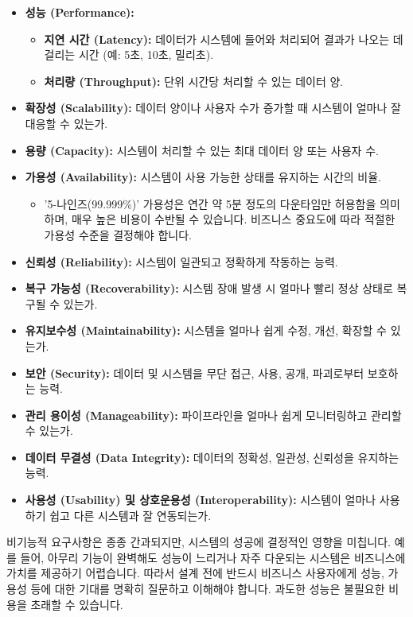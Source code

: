 \documentclass[11pt,a4paper]{article}
\theoremstyle{definition}
\begin{document}
\begin{itemize}
    \item \textbf{성능 (Performance):}
    \begin{itemize}
        \item \textbf{지연 시간 (Latency):} 데이터가 시스템에 들어와 처리되어 결과가 나오는 데 걸리는 시간 (예: 5초, 10초, 밀리초).
        \item \textbf{처리량 (Throughput):} 단위 시간당 처리할 수 있는 데이터 양.
    \end{itemize}
    \item \textbf{확장성 (Scalability):} 데이터 양이나 사용자 수가 증가할 때 시스템이 얼마나 잘 대응할 수 있는가.
    \item \textbf{용량 (Capacity):} 시스템이 처리할 수 있는 최대 데이터 양 또는 사용자 수.
    \item \textbf{가용성 (Availability):} 시스템이 사용 가능한 상태를 유지하는 시간의 비율.
    \begin{itemize}
        \item '5-나인즈(99.999\%)' 가용성은 연간 약 5분 정도의 다운타임만 허용함을 의미하며, 매우 높은 비용이 수반될 수 있습니다. 비즈니스 중요도에 따라 적절한 가용성 수준을 결정해야 합니다.
    \end{itemize}
    \item \textbf{신뢰성 (Reliability):} 시스템이 일관되고 정확하게 작동하는 능력.
    \item \textbf{복구 가능성 (Recoverability):} 시스템 장애 발생 시 얼마나 빨리 정상 상태로 복구될 수 있는가.
    \item \textbf{유지보수성 (Maintainability):} 시스템을 얼마나 쉽게 수정, 개선, 확장할 수 있는가.
    \item \textbf{보안 (Security):} 데이터 및 시스템을 무단 접근, 사용, 공개, 파괴로부터 보호하는 능력.
    \item \textbf{관리 용이성 (Manageability):} 파이프라인을 얼마나 쉽게 모니터링하고 관리할 수 있는가.
    \item \textbf{데이터 무결성 (Data Integrity):} 데이터의 정확성, 일관성, 신뢰성을 유지하는 능력.
    \item \textbf{사용성 (Usability) 및 상호운용성 (Interoperability):} 시스템이 얼마나 사용하기 쉽고 다른 시스템과 잘 연동되는가.
\end{itemize}

\begin{warningbox}
비기능적 요구사항은 종종 간과되지만, 시스템의 성공에 결정적인 영향을 미칩니다. 예를 들어, 아무리 기능이 완벽해도 성능이 느리거나 자주 다운되는 시스템은 비즈니스에 가치를 제공하기 어렵습니다. 따라서 설계 전에 반드시 비즈니스 사용자에게 성능, 가용성 등에 대한 기대를 명확히 질문하고 이해해야 합니다. 과도한 성능은 불필요한 비용을 초래할 수 있습니다.
\end{warningbox}
\end{document}
